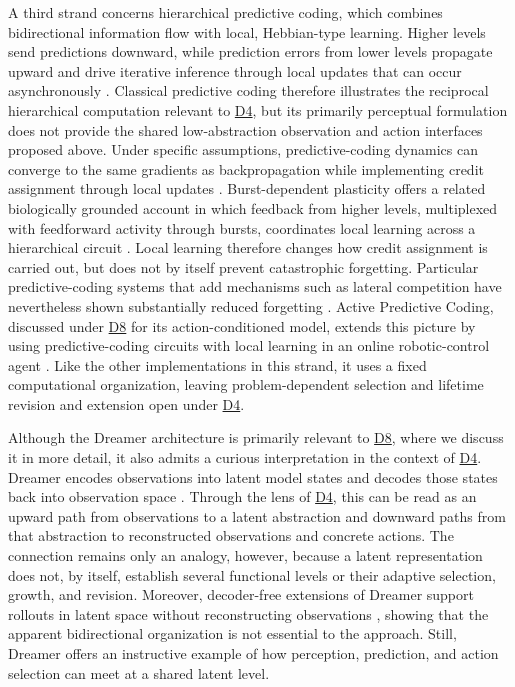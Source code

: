 \documentclass[10pt,journal,compsoc]{IEEEtran}
\DeclareRobustCommand{\Dref}[1]{\hyperref[sec:d#1]{D#1}}
\begin{document}
A third strand concerns hierarchical predictive coding, which combines bidirectional information flow with local, Hebbian-type learning.
Higher levels send predictions downward, while prediction errors from lower levels propagate upward and drive iterative inference through local updates that can occur asynchronously \cite{mumford1992,rao1999,salvatori2026}.
Classical predictive coding therefore illustrates the reciprocal hierarchical computation relevant to \Dref{4}, but its primarily perceptual formulation does not provide the shared low-abstraction observation and action interfaces proposed above.
Under specific assumptions, predictive-coding dynamics can converge to the same gradients as backpropagation while implementing credit assignment through local updates \cite{millidge2022}.
Burst-dependent plasticity offers a related biologically grounded account in which feedback from higher levels, multiplexed with feedforward activity through bursts, coordinates local learning across a hierarchical circuit \cite{payeur2021}.
Local learning therefore changes how credit assignment is carried out, but does not by itself prevent catastrophic forgetting.
Particular predictive-coding systems that add mechanisms such as lateral competition have nevertheless shown substantially reduced forgetting \cite{ororbia2022}.
Active Predictive Coding, discussed under \Dref{8} for its action-conditioned model, extends this picture by using predictive-coding circuits with local learning in an online robotic-control agent \cite{ororbia2023}.
Like the other implementations in this strand, it uses a fixed computational organization, leaving problem-dependent selection and lifetime revision and extension open under \Dref{4}.

Although the Dreamer architecture is primarily relevant to \Dref{8}, where we discuss it in more detail, it also admits a curious interpretation in the context of \Dref{4}.
Dreamer encodes observations into latent model states and decodes those states back into observation space \cite{hafner2020}.
Through the lens of \Dref{4}, this can be read as an upward path from observations to a latent abstraction and downward paths from that abstraction to reconstructed observations and concrete actions.
The connection remains only an analogy, however, because a latent representation does not, by itself, establish several functional levels or their adaptive selection, growth, and revision.
Moreover, decoder-free extensions of Dreamer support rollouts in latent space without reconstructing observations \cite{okada2021,deng2022}, showing that the apparent bidirectional organization is not essential to the approach.
Still, Dreamer offers an instructive example of how perception, prediction, and action selection can meet at a shared latent level.
\end{document}
